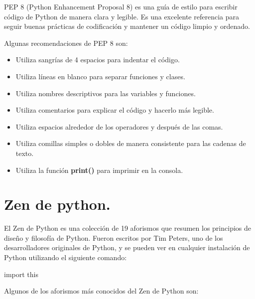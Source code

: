 \documentclass[
  a4paper,
  DIV=11,
  numbers=noendperiod,
  onepage,
  openany]{scrreprt}
\newenvironment{Shaded}{\begin{snugshade}}{\end{snugshade}}
\newcommand{\ExtensionTok}[1]{\textcolor[rgb]{0.00,0.23,0.31}{#1}}
\newcommand{\NormalTok}[1]{\textcolor[rgb]{0.00,0.23,0.31}{#1}}
\begin{document}
PEP 8 (Python Enhancement Proposal 8) es una guía de estilo para
escribir código de Python de manera clara y legible. Es una excelente
referencia para seguir buenas prácticas de codificación y mantener un
código limpio y ordenado.

Algunas recomendaciones de PEP 8 son:

\begin{itemize}
\item
  Utiliza sangrías de 4 espacios para indentar el código.
\item
  Utiliza líneas en blanco para separar funciones y clases.
\item
  Utiliza nombres descriptivos para las variables y funciones.
\item
  Utiliza comentarios para explicar el código y hacerlo más legible.
\item
  Utiliza espacios alrededor de los operadores y después de las comas.
\item
  Utiliza comillas simples o dobles de manera consistente para las
  cadenas de texto.
\item
  Utiliza la función \textbf{print()} para imprimir en la consola.
\end{itemize}

\chapter{Zen de python.}\label{zen-de-python.}

El Zen de Python es una colección de 19 aforismos que resumen los
principios de diseño y filosofía de Python. Fueron escritos por Tim
Peters, uno de los desarrolladores originales de Python, y se pueden ver
en cualquier instalación de Python utilizando el siguiente comando:

\begin{Shaded}
\begin{Highlighting}[]
\ExtensionTok{import}\NormalTok{ this}
\end{Highlighting}
\end{Shaded}

Algunos de los aforismos más conocidos del Zen de Python son:
\end{document}
